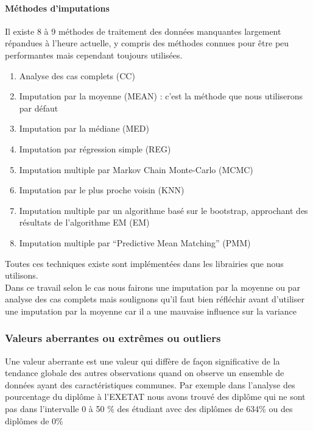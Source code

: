 \paragraph{Méthodes d'imputations} 

Il existe 8 à 9 méthodes de traitement des données manquantes
largement répandues à l'heure actuelle, y compris des méthodes connues
pour être peu performantes mais cependant toujours utilisées. 
\begin{enumerate}
	\item Analyse des cas complets (CC)
	\item Imputation par la moyenne (MEAN) : c'est la
	méthode que nous utiliserons par défaut
	\item Imputation par la médiane
	(MED)
	\item  Imputation par régression simple (REG)
	\item Imputation multiple par Markov Chain Monte-Carlo (MCMC)
	\item  Imputation par le plus proche
	voisin (KNN)
	\item Imputation multiple par un algorithme basé sur le
	bootstrap, approchant des résultats de l'algorithme EM (EM)
	\item Imputation multiple par ``Predictive Mean Matching'' (PMM)
\end{enumerate}
Toutes ces techniques existe sont implémentées dans les librairies que nous
utilisons.\\
Dans ce travail selon le cas nous fairons  une imputation par la
moyenne ou par analyse des cas complets mais soulignons qu'il faut bien
réfléchir avant d'utiliser une imputation par la moyenne car il a une
mauvaise influence sur la variance
\subsubsection{Valeurs aberrantes ou extrêmes ou outliers}
Une valeur aberrante est une valeur qui diffère de façon significative
de la tendance globale des autres observations quand on observe un
ensemble de données ayant des caractéristiques communes. Par exemple
dans l'analyse des pourcentage du diplôme à l'EXETAT nous avons trouvé
des diplôme qui ne sont pas dans l'intervalle 0 à 50 \% des étudiant
avec des diplômes de 634\% ou des diplômes de 0\%

